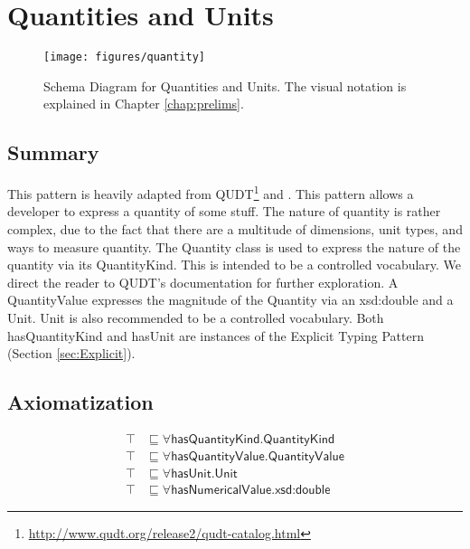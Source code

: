 \section{Quantities and Units}
\label{sec:Quantities}
\begin{figure}[h!]
\begin{center}
\texttt{[image: figures/quantity]}
\end{center}
\caption{Schema Diagram for Quantities and Units. The visual notation is explained in Chapter \ref{chap:prelims}.}
\label{fig:Quantities}
\end{figure}
\subsection{Summary}
\label{sum:Quantities}
This pattern is heavily adapted from QUDT\footnote{\url{http://www.qudt.org/release2/qudt-catalog.html}} and \cite{momtut}. This pattern allows a developer to express a quantity of some stuff. The nature of quantity is rather complex, due to the fact that there are a multitude of dimensions, unit types, and ways to measure quantity. The \textsf{Quantity} class is used to express the nature of the quantity via its \textsf{QuantityKind}. This is intended to be a controlled vocabulary. We direct the reader to QUDT's documentation for further exploration. A \textsf{QuantityValue} expresses the magnitude of the \textsf{Quantity} via an \textsf{xsd:double} and a \textsf{Unit}. Unit is also recommended to be a controlled vocabulary. Both \textsf{hasQuantityKind} and \textsf{hasUnit} are instances of the Explicit Typing Pattern (Section \ref{sec:Explicit}).

\subsection{Axiomatization}
\label{axs:Quantities}
\begin{align}
\top &\sqsubseteq \forall \textsf{hasQuantityKind.QuantityKind} \\
\top &\sqsubseteq \forall \textsf{hasQuantityValue.QuantityValue} \\
\top &\sqsubseteq \forall \textsf{hasUnit.Unit} \\
\top &\sqsubseteq \forall \textsf{hasNumericalValue.xsd:double}
\end{align}

